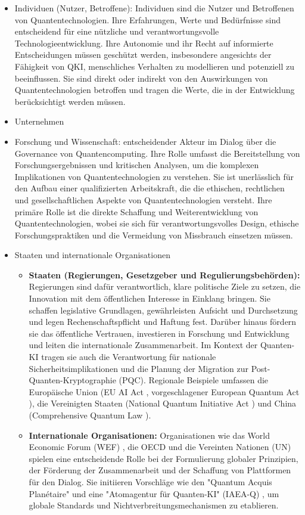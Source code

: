 \begin{itemize}
    \item Individuen (Nutzer, Betroffene): Individuen sind die Nutzer und Betroffenen von Quantentechnologien. Ihre Erfahrungen, Werte und Bedürfnisse sind entscheidend für eine nützliche und verantwortungsvolle Technologieentwicklung. Ihre Autonomie und ihr Recht auf informierte Entscheidungen müssen geschützt werden, insbesondere angesichts der Fähigkeit von QKI, menschliches Verhalten zu modellieren und potenziell zu beeinflussen. Sie sind direkt oder indirekt von den Auswirkungen von Quantentechnologien betroffen und tragen die Werte, die in der Entwicklung berücksichtigt werden müssen.
    \item Unternehmen
    \item Forschung und Wissenschaft: entscheidender Akteur im Dialog über die Governance von Quantencomputing. Ihre Rolle umfasst die Bereitstellung von Forschungsergebnissen und kritischen Analysen, um die komplexen Implikationen von Quantentechnologien zu verstehen. Sie ist unerlässlich für den Aufbau einer qualifizierten Arbeitskraft, die die ethischen, rechtlichen und gesellschaftlichen Aspekte von Quantentechnologien versteht. Ihre primäre Rolle ist die direkte Schaffung und Weiterentwicklung von Quantentechnologien, wobei sie sich für verantwortungsvolles Design, ethische Forschungspraktiken und die Vermeidung von Missbrauch einsetzen müssen.
    \item Staaten und internationale Organisationen
    \begin{itemize}
    \item \textbf{Staaten (Regierungen, Gesetzgeber und Regulierungsbehörden):} Regierungen sind dafür verantwortlich, klare politische Ziele zu setzen, die Innovation mit dem öffentlichen Interesse in Einklang bringen. Sie schaffen legislative Grundlagen, gewährleisten Aufsicht und Durchsetzung und legen Rechenschaftspflicht und Haftung fest. Darüber hinaus fördern sie das öffentliche Vertrauen, investieren in Forschung und Entwicklung und leiten die internationale Zusammenarbeit. Im Kontext der Quanten-KI tragen sie auch die Verantwortung für nationale Sicherheitsimplikationen und die Planung der Migration zur Post-Quanten-Kryptographie (PQC). Regionale Beispiele umfassen die Europäische Union (EU AI Act , vorgeschlagener European Quantum Act ), die Vereinigten Staaten (National Quantum Initiative Act ) und China (Comprehensive Quantum Law ). 
    \item \textbf{Internationale Organisationen:} Organisationen wie das World Economic Forum (WEF) , die OECD  und die Vereinten Nationen (UN)  spielen eine entscheidende Rolle bei der Formulierung globaler Prinzipien, der Förderung der Zusammenarbeit und der Schaffung von Plattformen für den Dialog. Sie initiieren Vorschläge wie den "Quantum Acquis Planétaire"  und eine "Atomagentur für Quanten-KI" (IAEA-Q) , um globale Standards und Nichtverbreitungsmechanismen zu etablieren.

\end{itemize}
\end{itemize}

